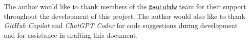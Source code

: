 The author would like to thank members of the \href{https://github.com/autohdw}{\texttt{@autohdw}} team for
their support throughout the development of this project.
The author would also like to thank \textit{GitHub Copilot} and \textit{ChatGPT Codex}
for code suggestions during development
and for assistance in drafting this document.
